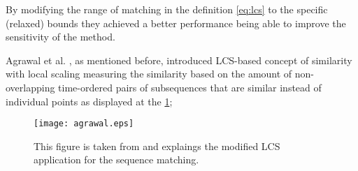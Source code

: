 By modifying the range of matching in the definition \ref{eq:lcs} to the specific (relaxed) bounds they achieved a better performance being able to improve the sensitivity of the method. 

Agrawal et al. \cite{citeulike:3816327}, as mentioned before, introduced LCS-based concept of similarity with local scaling measuring the similarity based on the amount of non-overlapping time-ordered pairs of subsequences that are similar instead of individual points as displayed at the \ref{fig:agrawal_lcs};

\begin{figure}[tbp]
   \centering
   \texttt{[image: agrawal.eps]}
   \caption{This figure is taken from \cite{citeulike:3816327} and explaings the modified LCS application for the sequence matching.}
   \label{fig:agrawal_lcs}
\end{figure} 